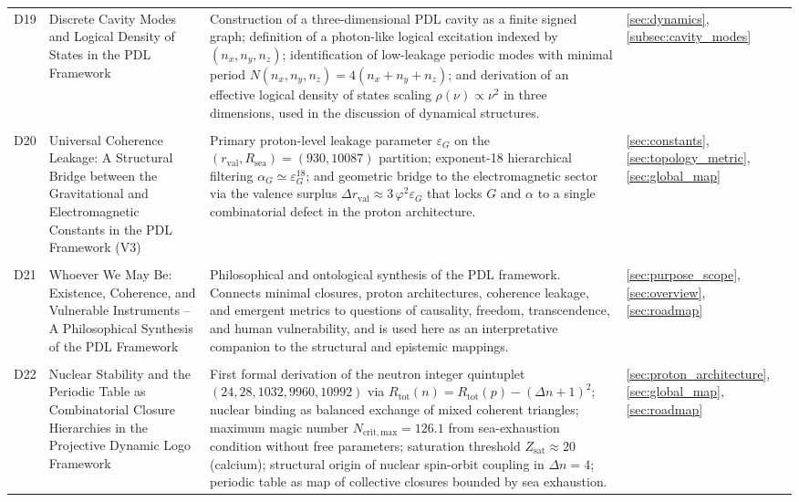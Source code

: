\documentclass[11pt,a4paper]{article}
\begin{document}
\begin{longtable}{@{}p{0.9cm}L{5cm}L{6.5cm}L{2.4cm}@{}}
  D19 & 
  Discrete Cavity Modes and Logical Density of States in the PDL Framework & Construction of a three-dimensional PDL cavity as a finite signed graph; definition of a photon-like logical excitation indexed by $(n_x,n_y,n_z)$; identification of low-leakage periodic modes with minimal period $N(n_x,n_y,n_z)=4(n_x+n_y+n_z)$; and derivation of an effective logical density of states scaling $\rho(\nu)\propto \nu^2$ in three dimensions, used in the discussion of dynamical structures. & 
  \ref{sec:dynamics}, \ref{subsec:cavity_modes} \\\\[0.4em]

  D20 &
  {Universal Coherence Leakage: A Structural Bridge between the Gravitational and Electromagnetic Constants in the PDL Framework} (V3) &
  Primary proton-level leakage parameter $\varepsilon_G$ on the $(r_{\mathrm{val}},R_{\mathrm{sea}})=(930,10087)$ partition; exponent-18 hierarchical filtering $\alpha_G \simeq \varepsilon_G^{18}$; and geometric bridge to the electromagnetic sector via the valence surplus $\Delta r_{\mathrm{val}} \approx 3\,\varphi^2 \varepsilon_G$ that locks $G$ and $\alpha$ to a single combinatorial defect in the proton architecture. &
  \ref{sec:constants}, \ref{sec:topology_metric}, \ref{sec:global_map} \\\\[0.4em]

  D21 & 
  Whoever We May Be: Existence, Coherence, and Vulnerable Instruments -- A Philosophical Synthesis of the PDL Framework & 
  Philosophical and ontological synthesis of the PDL framework.\citep{WhoeverWeMayBe2026} Connects minimal closures, proton architectures, coherence leakage, and emergent metrics to questions of causality, freedom, transcendence, and human vulnerability, and is used here as an interpretative companion to the structural and epistemic mappings. & 
  \ref{sec:purpose_scope}, \ref{sec:overview}, \ref{sec:roadmap} \\\\[0.4em]

D22 &
  Nuclear Stability and the Periodic Table as Combinatorial Closure Hierarchies in the Projective Dynamic Logo Framework &
  First formal derivation of the neutron integer quintuplet $(24,28,1032,9960,10992)$ via $R_{\mathrm{tot}}(n) = R_{\mathrm{tot}}(p) - (\Delta n+1)^2$; nuclear binding as balanced exchange of mixed coherent triangles; maximum magic number $N_{\mathrm{crit,max}} = 126.1$ from sea-exhaustion condition without free parameters; saturation threshold $Z_{\mathrm{sat}} \approx 20$ (calcium); structural origin of nuclear spin-orbit coupling in $\Delta n = 4$; periodic table as map of collective closures bounded by sea exhaustion.\citep{Nuclear_Stability_PDL_2026} &
  \ref{sec:proton_architecture}, \ref{sec:global_map}, \ref{sec:roadmap} \\[0.4em]

\end{longtable}
\end{document}
